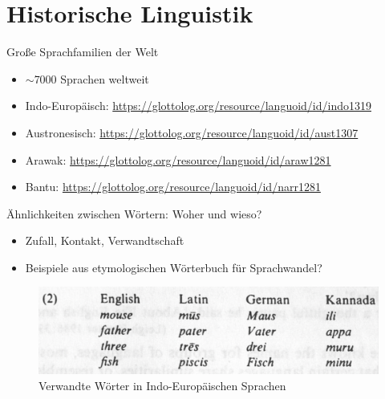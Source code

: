 \section{Historische Linguistik}
\begin{frame}{Große Sprachfamilien der Welt}
	\begin{itemize}
		\item $\sim$7000 Sprachen weltweit
		\item Indo-Europäisch: \url{https://glottolog.org/resource/languoid/id/indo1319}
		\item Austronesisch: \url{https://glottolog.org/resource/languoid/id/aust1307}
		\item Arawak: \url{https://glottolog.org/resource/languoid/id/araw1281}
		\item Bantu: \url{https://glottolog.org/resource/languoid/id/narr1281}
	\end{itemize}
\end{frame}

\begin{frame}{Ähnlichkeiten zwischen Wörtern: Woher und wieso?}
	\begin{itemize}
		\pause
		\item Zufall, Kontakt, Verwandtschaft
		\pause
		\item Beispiele aus etymologischen Wörterbuch für Sprachwandel? \pause
	\end{itemize}
	\begin{figure}
		\includegraphics[height=0.3\textheight]{images/ie_korrespondenzen.png}
		\caption{Verwandte Wörter in Indo-Europäischen Sprachen \parencite{McMahon1994}}
	\end{figure}
\end{frame}
		


